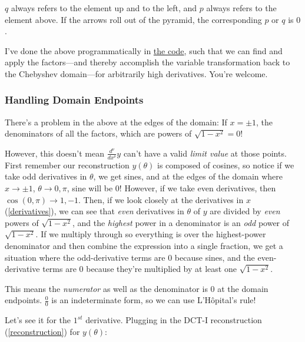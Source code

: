 \documentclass[10pt]{article}
\begin{document}
$q$ always refers to the element up and to the left, and $p$ always refers to the element above. If the arrows roll out of the pyramid, the corresponding $p$ or $q$ is $0$.

I've done the above programmatically in \href{https://github.com/pavelkomarov/spectral-derivatives/blob/main/specderiv/specderiv.py}{the code}, such that we can find and apply the factors---and thereby accomplish the variable transformation back to the Chebyshev domain---for arbitrarily high derivatives. You're welcome.

\subsubsection{Handling Domain Endpoints}\label{endpoints}

There's a problem in the above at the edges of the domain: If $x = \pm 1$, the denominators of all the factors, which are powers of $\sqrt{1 - x^2} = 0$!

However, this doesn't mean $\frac{d^\nu}{dx^\nu} y$ can't have a valid \textit{limit value} at those points. First remember our reconstruction $y(\theta)$ is composed of cosines, so notice if we take odd derivatives in $\theta$, we get sines, and at the edges of the domain where $x \rightarrow \pm 1$, $\theta \rightarrow 0,\pi$, sine will be 0! However, if we take even derivatives, then $\cos(0,\pi) \rightarrow 1, -1$. Then, if we look closely at the derivatives in $x$ (\autoref{derivatives}), we can see that \textit{even} derivatives in $\theta$ of $y$ are divided by \textit{even} powers of $\sqrt{1 - x^2}$, and the \textit{highest} power in a denominator is an \textit{odd} power of $\sqrt{1 - x^2}$. If we multiply through so everything is over the highest-power denominator and then combine the expression into a single fraction, we get a situation where the odd-derivative terms are 0 because sines, and the even-derivative terms are 0 because they're multiplied by at least one $\sqrt{1 - x^2}$.

This means the \textit{numerator} as well as the denominator is $0$ at the domain endpoints. $\frac{0}{0}$ is an indeterminate form, so we can use L'Hôpital's rule!

Let's see it for the $1^{st}$ derivative. Plugging in the DCT-I reconstruction (\autoref{reconstruction}) for $y(\theta)$:
\end{document}
